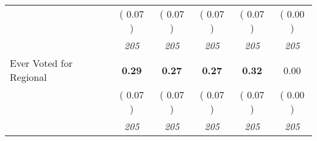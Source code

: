\begin{tabular}{l c c c c c}
& (     0.07 ) & (     0.07 ) & (     0.07 ) & (     0.07 ) & (     0.00 ) \\
& \textit{ 205 } & \textit{ 205 } & \textit{ 205 } & \textit{ 205 } & \textit{ 205 } \\
Ever Voted for Regional & \textbf{      0.29 } & \textbf{      0.27 } & \textbf{      0.27 } & \textbf{     0.32} &      0.00 \\
& (     0.07 ) & (     0.07 ) & (     0.07 ) & (     0.07 ) & (     0.00 ) \\
& \textit{ 205 } & \textit{ 205 } & \textit{ 205 } & \textit{ 205 } & \textit{ 205 } \\
\bottomrule
\end{tabular}
